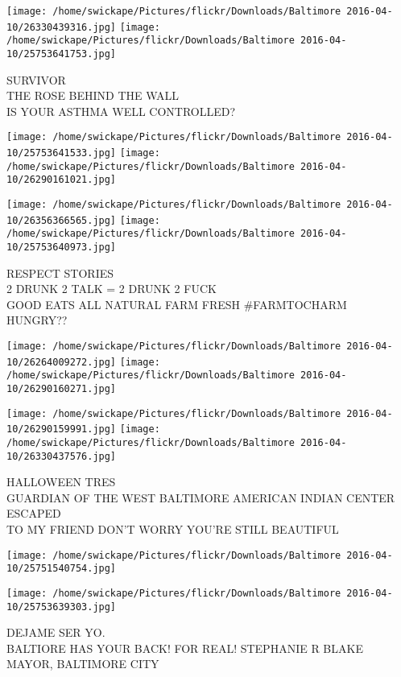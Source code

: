 \documentclass[10pt,letterpaper]{article}
\begin{document}
\vspace{0.25in}
\texttt{[image: /home/swickape/Pictures/flickr/Downloads/Baltimore 2016-04-10/26330439316.jpg]}
\texttt{[image: /home/swickape/Pictures/flickr/Downloads/Baltimore 2016-04-10/25753641753.jpg]}

SURVIVOR\\
THE ROSE BEHIND THE WALL\\
IS YOUR ASTHMA WELL CONTROLLED?
\pagebreak

\texttt{[image: /home/swickape/Pictures/flickr/Downloads/Baltimore 2016-04-10/25753641533.jpg]}
\texttt{[image: /home/swickape/Pictures/flickr/Downloads/Baltimore 2016-04-10/26290161021.jpg]}

\texttt{[image: /home/swickape/Pictures/flickr/Downloads/Baltimore 2016-04-10/26356366565.jpg]}
\texttt{[image: /home/swickape/Pictures/flickr/Downloads/Baltimore 2016-04-10/25753640973.jpg]}

RESPECT STORIES\\
2 DRUNK 2 TALK = 2 DRUNK 2 FUCK\\
GOOD EATS ALL NATURAL FARM FRESH \#FARMTOCHARM\\
HUNGRY??
\pagebreak

\texttt{[image: /home/swickape/Pictures/flickr/Downloads/Baltimore 2016-04-10/26264009272.jpg]}
\texttt{[image: /home/swickape/Pictures/flickr/Downloads/Baltimore 2016-04-10/26290160271.jpg]}

\texttt{[image: /home/swickape/Pictures/flickr/Downloads/Baltimore 2016-04-10/26290159991.jpg]}
\texttt{[image: /home/swickape/Pictures/flickr/Downloads/Baltimore 2016-04-10/26330437576.jpg]}

HALLOWEEN TRES\\
GUARDIAN OF THE WEST BALTIMORE AMERICAN INDIAN CENTER\\
ESCAPED\\
TO MY FRIEND DON'T WORRY YOU'RE STILL BEAUTIFUL
\pagebreak

\texttt{[image: /home/swickape/Pictures/flickr/Downloads/Baltimore 2016-04-10/25751540754.jpg]}

\vspace{0.25in}
\texttt{[image: /home/swickape/Pictures/flickr/Downloads/Baltimore 2016-04-10/25753639303.jpg]}

DEJAME SER YO.\\
BALTIORE HAS YOUR BACK!  FOR REAL!  STEPHANIE R BLAKE MAYOR, BALTIMORE CITY
\pagebreak
\end{document}
